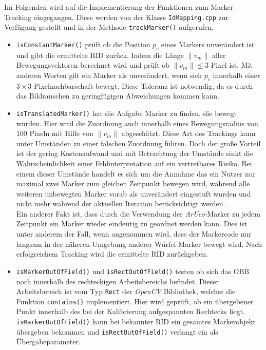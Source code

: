 Im Folgenden wird auf die Implementierung der Funktionen zum Marker Tracking eingegangen. Diese werden von der Klasse \texttt{IdMapping.cpp} zur Verfügung gestellt und in der Methode \texttt{track\-Marker()} aufgerufen.
\begin{itemize}
\item \texttt{is\-Constant\-Marker()} prüft ob die Position $p_c$ eines Markers unverändert ist und gibt die ermittelte RID zurück. Indem die Länge $\|v_m\|$ aller Bewegungsvektoren berechnet wird und prüft ob $\|v_m\|\le 3$ Pixel ist. Mit anderen Worten gilt ein Marker als unverändert, wenn sich $p_c$ innerhalb einer $3 \times 3$ Pixelnachbarschaft bewegt. Diese Toleranz ist notwendig, da es durch das Bildrauschen zu geringfügigen Abweichungen kommen kann.
\item \texttt{is\-Translated\-Marker()} hat die Aufgabe Marker zu finden, die bewegt wurden. Hier wird die Zuordnung auch innerhalb eines Bewegungsradius von $100$ Pixeln mit Hilfe von $\|v_m\|$  abgeschätzt. Diese Art des Trackings kann unter Umständen zu einer falschen Zuordnung führen. Doch der große Vorteil ist der gering Kostenaufwand und mit Betrachtung der Umstände sinkt die Wahrscheinlichkeit einer Fehlinterpretation auf ein vertretbares Risiko. Bei einem dieser Umstände handelt es sich um die Annahme das ein Nutzer nur maximal zwei Marker zum gleichen Zeitpunkt bewegen wird, während alle weiteren unbewegten Marker vorab als unverändert eingestuft wurden und nicht mehr während der aktuellen Iteration berücksichtigt werden.\\
Ein anderer Fakt ist, dass durch die Verwendung der \textit{ArUco}-Marker zu jedem Zeitpunkt ein Marker wieder eindeutig zu geordnet werden kann. Dies ist unter anderem der Fall, wenn angenommen wird, dass der Markercode nur langsam in der näheren Umgebung anderer Würfel-Marker bewegt wird. Nach erfolgreichem Tracking wird die ermittelte RID zurückgeben.
\item \texttt{isMarker\-Out\-OfField()} und \texttt{is\-Rect\-Out\-Of\-Field()} testen ob sich das OBB noch innerhalb des rechteckigen Arbeitsbereichs befindet. Dieser Arbeitsbereich ist vom Typ \texttt{Rect} der \textit{OpenCV} Bibliothek, welcher die Funktion \texttt{con\-tains()} implementiert. Hier wird geprüft, ob ein übergebener Punkt innerhalb des bei der Kalibrierung aufgespannten Rechtecks liegt. \texttt{isMarker\-OutOf\-Field()} kann bei bekannter RID ein gesamtes Markerobjekt übergeben bekommen und \texttt{is\-Rect\-Out\-Of\-Field()} verlangt ein  als Übergabeparameter.

\end{itemize}
